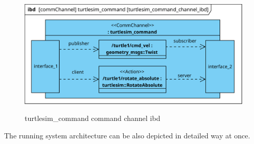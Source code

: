 \documentclass[11pt,oneside,a4paper]{report}
\begin{document}
\begin{figure}[H]
	\centering
	\begin{center}
		{\includegraphics[scale=1.0]{diagrams/turtlesim_command_channel_ibd.png}}
	\end{center}
	\caption{turtlesim\_command command channel ibd}
	\label{fig:turtlesim_command_channel_ibd}
\end{figure}
			
			
			
The running system architecture can be also depicted in detailed way at once.
			
			
			
			
\AtNextBibliography{\small}
\printbibliography
	
\end{document}
